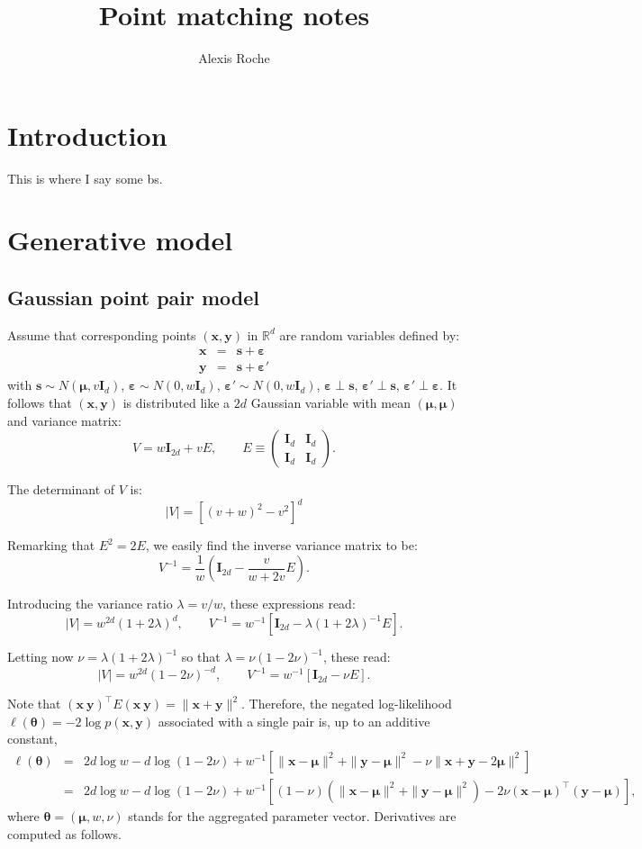 \documentclass{article}
\title{Point matching notes}
\author{Alexis Roche}
\def\x{{\mathbf{x}}}
\def\y{{\mathbf{y}}}
\def\s{{\mathbf{s}}}
\def\I{{\mathbf{I}}}
\def\eps{{\boldsymbol{\varepsilon}}}
\def\m{{\boldsymbol{\mu}}}
\def\param{{\boldsymbol{\theta}}}
\begin{document}
\maketitle      

\section{Introduction}

This is where I say some bs.


\section{Generative model}

\subsection{Gaussian point pair model}

Assume that corresponding points $(\x,\y)$ in $\mathbb{R}^d$ are random variables defined by:
\begin{eqnarray*}
\x & = & \s + \eps\\
\y & = & \s + \eps'
\end{eqnarray*}
with $\s\sim N(\m, v \I_d)$, $\eps\sim N(0, w \I_d)$, $\eps'\sim N(0, w \I_d)$, $\eps\perp \s$, $\eps'\perp \s$, $\eps'\perp \eps$. It follows that $(\x,\y)$ is distributed like a $2d$ Gaussian variable with mean $(\m,\m)$ and variance matrix:
$$
V = w \I_{2d} + v E,
\qquad
E \equiv
\left(
\begin{array}{cc}
\I_d & \I_d\\
\I_d & \I_d
\end{array}
\right)
.
$$

The determinant of $V$ is: 
$$
|V| = \left[ (v+w)^2 - v^2 \right]^d
$$

Remarking that $E^2=2E$, we easily find the inverse variance matrix to be:
$$
V^{-1} 
= 
\frac{1}{w} \left(\I_{2d} - \frac{v}{w+2v} E \right)
.
$$

Introducing the variance ratio $\lambda = v/w$, these expressions read:
$$
|V| = w^{2d} (1 + 2\lambda)^d,
\qquad
V^{-1} = 
w^{-1} \left[ 
\I_{2d} - \lambda (1+2\lambda)^{-1} E
\right] 
.
$$

Letting now $\nu=\lambda (1+2\lambda)^{-1}$ so that $\lambda=\nu(1-2\nu)^{-1}$, these read:
$$
|V| = w^{2d} (1 - 2\nu)^{-d},
\qquad
V^{-1} = 
w^{-1} \left[ 
\I_{2d} - \nu E
\right] 
.
$$

Note that $(\x\ \y)^\top E (\x\ \y)= \|\x+\y\|^2$. Therefore, the negated log-likelihood $\ell(\param) = -2\log p(\x,\y)$ associated with a single pair is, up to an additive constant,
\begin{eqnarray*}
\ell(\param)
& = & 
2d \log w - d \log(1-2\nu) 
+ w^{-1} \left[
\|\x-\m\|^2 + \|\y-\m\|^2 - \nu \|\x+\y-2\m\|^2
\right] \\
& = & 
2d \log w - d \log(1-2\nu)
+ w^{-1} \left[
(1-\nu) (\|\x-\m\|^2 + \|\y-\m\|^2) 
- 2 \nu (\x-\m)^\top(\y-\m)
\right]
,
\end{eqnarray*}
where $\param=(\m, w,\nu)$ stands for the aggregated parameter vector. Derivatives are computed as follows.
\end{document}
